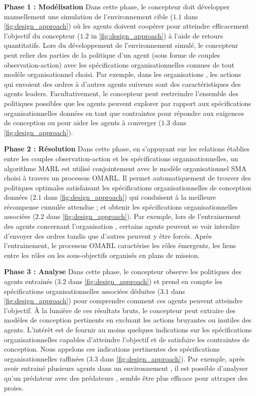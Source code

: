 \documentclass[contribution]{jfsma}
\newcounter{relation}
\begin{document}
\textbf{Phase 1 : Modélisation} \quad Dans cette phase, le concepteur doit développer manuellement une simulation de l'environnement cible ($1.1$ dans \autoref{fig:design_approach}) où les agents doivent coopérer pour atteindre efficacement l'objectif du concepteur ($1.2 $ in \autoref{fig:design_approach}) à l'aide de retours quantitatifs. Lors du développement de l'environnement simulé, le concepteur peut relier des parties de la politique d'un agent (sous forme de couples observation-action) avec les spécifications organisationnelles connues de tout modèle organisationnel choisi.
Par exemple, dans les organisations , les actions qui envoient des ordres à d'autres agents suiveurs sont des caractéristiques des agents leaders.
Facultativement, le concepteur peut restreindre l'ensemble des politiques possibles que les agents peuvent explorer par rapport aux spécifications organisationnelles données en tant que contraintes pour répondre aux exigences de conception ou pour aider les agents à converger ($1.3$ dans \autoref{fig:design_approach}).

\textbf{Phase 2 : Résolution} \quad Dans cette phase, en s'appuyant sur les relations établies entre les couples observation-action et les spécifications organisationnelles, un algorithme MARL est utilisé conjointement avec le modèle organisationnel SMA choisi à travers un processus OMARL. Il permet automatiquement de trouver des politiques optimales satisfaisant les spécifications organisationnelles de conception données ($2.1$ dans \autoref{fig:design_approach}) qui conduisent à la meilleure récompense cumulée attendue ; et obtenir les spécifications organisationnelles associées ($2.2$ dans \autoref{fig:design_approach}). Par exemple, lors de l'entrainement des agents concernant l'organisation , certains agents peuvent se voir interdire d'envoyer des ordres tandis que d'autres peuvent y être forcés. Après l'entrainement, le processus OMARL caractérise les rôles émergents, les liens entre les rôles ou les sous-objectifs organisés en plans de mission.

\textbf{Phase 3 : Analyse} \quad Dans cette phase, le concepteur observe les politiques des agents entrainés ($3.2$ dans \autoref{fig:design_approach}) et prend en compte les spécifications organisationnelles associées déduites ($3.1$ dans \autoref{fig:design_approach}) pour comprendre comment ces agents peuvent atteindre l'objectif. À la lumière de ces résultats bruts, le concepteur peut extraire des modèles de conception pertinents en excluant les actions bruyantes ou inutiles des agents. L'intérêt est de fournir au moins quelques indications sur les spécifications organisationnelles capables d'atteindre l'objectif et de satisfaire les contraintes de conception. Nous appelons ces indications pertinentes des spécifications organisationnelles raffinées ($3.3$ dans \autoref{fig:design_approach}). Par exemple, après avoir entrainé plusieurs agents dans un environnement , il est possible d'analyser qu'un prédateur  avec des prédateurs , semble être plus efficace pour attraper des proies.
\end{document}
